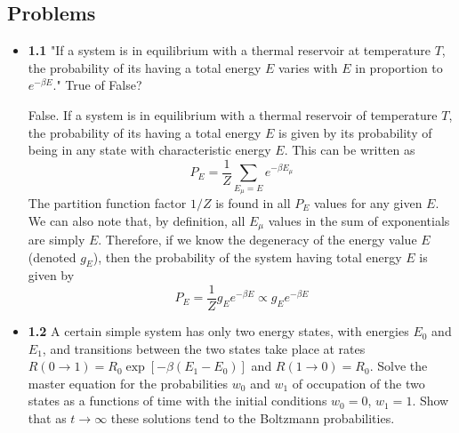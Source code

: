 \documentclass{article}
\begin{document}
\subsection{Problems}
\begin{itemize}
\item \textbf{1.1} "If a system is in equilibrium with a thermal reservoir at temperature $T$, the probability
of its having a total energy $E$ varies with $E$ in proportion to $e^{-\beta E}.$" True of False?

{\color{red} False. If a system is in equilibrium with a thermal reservoir of temperature $T$, the
probability of its having a total energy $E$ is given by its probability of being in any state with characteristic
energy $E$. This can be written as
$$P_{E} = \frac{1}{Z}\sum_{E_{\mu} = E}e^{-\beta E_{\mu}}$$
The partition function factor $1/Z$ is found in all $P_{E}$ values for any given $E$. We can also note that,
by definition, all $E_{\mu}$ values in the sum of exponentials are simply $E$. Therefore, if we know the degeneracy
of the energy value $E$ (denoted $g_{E}$), then the probability of the system having total energy $E$ is given by
$$P_{E} = \frac{1}{Z}g_{E}e^{-\beta E} \propto g_{E}e^{-\beta E}$$
}

\item \textbf{1.2} A certain simple system has only two energy states, with energies $E_{0}$ and $E_{1}$, and
transitions between the two states take place at rates $R(0 \rightarrow 1) = R_{0}\exp[-\beta (E_{1} - E_{0})]$
and $R(1 \rightarrow 0) = R_{0}$. Solve the master equation for the probabilities $w_{0}$ and $w_{1}$ of
occupation of the two states as a functions of time with the initial conditions $w_{0} = 0$, $w_{1} = 1$.
Show that as $t \rightarrow \infty$ these solutions tend to the Boltzmann probabilities.


\end{itemize}
\end{document}
